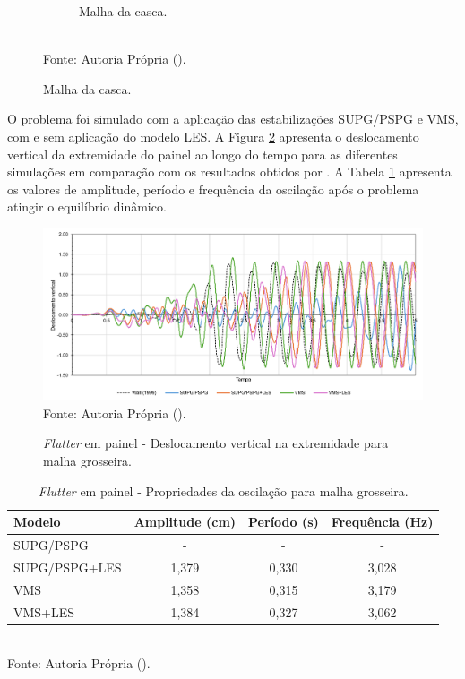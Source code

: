 \begin{figure}[h!]
\begin{subfigure}[b]{0.49\textwidth}
        \caption{Malha da casca.}
    \end{subfigure}
    \\Fonte: Autoria Própria (\the\year).
    \label{fig:meshPanel2}
\end{figure}

O problema foi simulado com a aplicação das estabilizações SUPG/PSPG e VMS, com e sem aplicação do modelo LES. A Figura \ref{fig:prismRes2} apresenta o deslocamento vertical da extremidade do painel ao longo do tempo para as diferentes simulações em comparação com os resultados obtidos por . A Tabela \ref{tab:prismRes2} apresenta os valores de amplitude, período e frequência da oscilação após o problema atingir o equilíbrio dinâmico.

\begin{figure}[h!]
    \centering
    \caption{\textit{Flutter} em painel - Deslocamento vertical na extremidade para malha grosseira.}
    \includegraphics[width=\linewidth]{Figuras/flutter-coarse/disp_y.pdf}
    \\Fonte: Autoria Própria (\the\year).
    \label{fig:prismRes2}
\end{figure}

\begin{table}[h!]
    \centering
    \caption{\textit{Flutter} em painel - Propriedades da oscilação para malha grosseira.}
    \begin{tabular}{lccc}
        \hline
        Modelo        & Amplitude (cm) & Período (s) & Frequência (Hz) \\\hline
        SUPG/PSPG     & -              & -           & -               \\
        SUPG/PSPG+LES & 1,379          & 0,330       & 3,028           \\
        VMS           & 1,358          & 0,315       & 3,179           \\
        VMS+LES       & 1,384          & 0,327       & 3,062           \\\hline
    \end{tabular}
    \\Fonte: Autoria Própria (\the\year).
    \label{tab:prismRes2}
\end{table}


